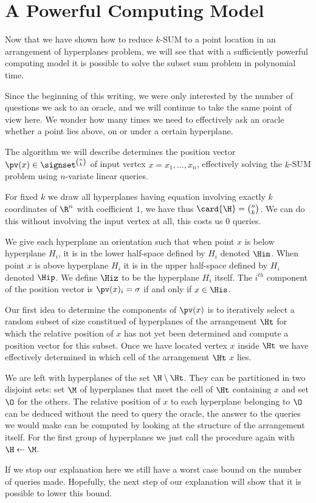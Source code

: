 \section{A Powerful Computing Model}

Now that we have shown how to reduce $k$-SUM to a point location in an
arrangement of hyperplanes problem, we will see that with a sufficiently
powerful computing model it is possible to solve the subset sum problem in
polynomial time.

Since the beginning of this writing, we were only interested by the number of
questions we ask to an oracle, and we will continue to take the same point of
view here. We wonder how many times we need to effectively ask an oracle
whether a point lies above, on or under a certain hyperplane.

The algorithm we will describe determines the position vector $\pv(x) \in
\signset^{\binom{n}{k}} $ of input vertex $x = {x_1, \dots, x_n}$, effectively
solving the $k$-SUM problem using  $n$-variate linear queries.

For fixed $k$ we draw all hyperplanes having equation involving exactly $k$
coordinates of $\R^n$ with coefficient $1$, we have thus $\card{\H} =
\binom{n}{k}$. We can do this without involving the input vertex at all, this
costs us $0$ queries.

We give each hyperplane an orientation such that when point $x$ is below
hyperplane $H_i$, it is in the lower half-space defined by $H_i$ denoted
$\Him$. When point $x$ is above hyperplane $H_i$ it is in the upper
half-space defined by $H_i$ denoted $\Hip$. We define $\Hiz$ to be the
hyperplane $H_i$ itself. The $i^{th}$ component of the position vector is
$\pv(x)_i = \sigma$ if and only if $x \in \His$.

Our first idea to determine the components of $\pv(x)$ is to iteratively
select a random subset of size  constitued of hyperplanes of the
arrangement $\Ht$ for which the relative position of $x$ has not yet been
determined and compute a position vector for this subset. Once we have located
vertex $x$ inside $\Ht$ we have effectively determined in
which cell of the arrangement $\Ht$ $x$ lies.

We are left with hyperplanes of the set $\H \setminus \Ht$. They can be
partitioned in two disjoint sets: set $\M$ of hyperplanes that meet the cell of
$\Ht$ containing $x$ and set $\O$ for the others. The relative position of $x$ to each
hyperplane belonging to $\O$ can be deduced without the need to query the oracle, the answer
to the queries we would make can be computed by looking at the structure of
the arrangement itself. For the first group of hyperplanes we just call the
procedure again with $\H \gets \M$.

If we stop our explanation here we still have a worst case 
bound on the number of queries made. Hopefully, the next step of our
explanation will show that it is possible to lower this bound.



